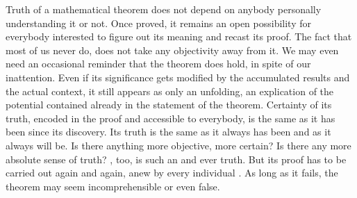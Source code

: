 Truth of a mathematical theorem does not depend on anybody personally
understanding it or not. Once proved, it remains an open possibility for everybody
interested to figure out its meaning and recast its proof. The fact that most of
us never do, does not take any {objectivity} away from it. We may even need an
occasional reminder that the theorem does hold, in spite of our inattention.
Even if its significance gets modified by the accumulated results and the actual
context, it still appears as only an unfolding, an explication of the potential
contained already in the statement of the theorem.  Certainty of its truth,
encoded in the proof and accessible to everybody, is the same as it has been
since its discovery. Its truth is the same as it always has been and as it
always will be.  Is there anything more objective, more certain?  Is there any
more absolute sense of truth?  \Yes, too, is such an  and
ever  truth. But its  proof has to be carried out again
and again, anew by every individual . As long as it fails, the
theorem may seem incomprehensible or even false.








